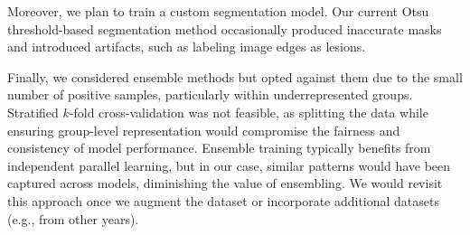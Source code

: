 Moreover, we plan to train a custom segmentation model. Our current Otsu threshold-based segmentation method occasionally produced inaccurate masks and introduced artifacts, such as labeling image edges as lesions.

Finally, we considered ensemble methods but opted against them due to the small number of positive samples, particularly within underrepresented groups. Stratified $k$-fold cross-validation was not feasible, as splitting the data while ensuring group-level representation would compromise the fairness and consistency of model performance. Ensemble training typically benefits from independent parallel learning, but in our case, similar patterns would have been captured across models, diminishing the value of ensembling. We would revisit this approach once we augment the dataset or incorporate additional datasets (e.g., from other years).